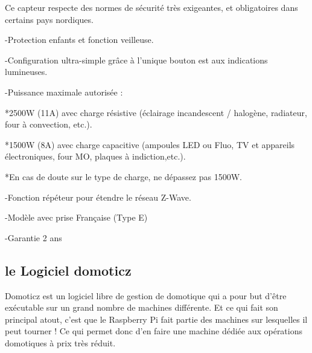 Ce capteur respecte des normes de sécurité très exigeantes, et obligatoires dans certains pays nordiques.


-Protection enfants et fonction veilleuse.


-Configuration ultra-simple grâce à l'unique bouton est aux indications lumineuses.


-Puissance maximale autorisée :

    *2500W (11A) avec charge résistive (éclairage incandescent / halogène, radiateur, four à convection, etc.).
    

    *1500W (8A) avec charge capacitive (ampoules LED ou Fluo, TV et appareils électroniques, four MO, plaques à indiction,etc.).
    
    
    *En cas de doute sur le type de charge, ne dépassez pas 1500W.


-Fonction répéteur pour étendre le réseau Z-Wave.


-Modèle avec prise Française (Type E)


-Garantie 2 ans 
\subsection{le Logiciel domoticz}
Domoticz est un logiciel libre de gestion de domotique qui a pour but d’être exécutable sur un grand nombre de machines différente. Et ce qui fait son principal atout, c’est que le Raspberry Pi fait partie des machines sur lesquelles il peut tourner ! Ce qui permet donc d’en faire une machine dédiée aux opérations domotiques à prix très réduit. 

